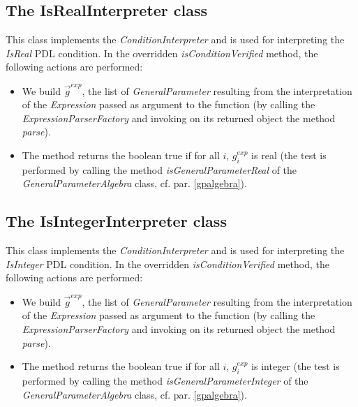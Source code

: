\documentclass[a4paper,11pt] {ivoa}
\begin{document}
\subsection{The IsRealInterpreter class}
This class  implements the  {\it ConditionInterpreter} and is used for interpreting the {\it IsReal} PDL condition. In the overridden {\it isConditionVerified} method, the following actions are performed:
\begin{itemize}
\item We build $\vec g^{exp}$, the list of {\it GeneralParameter} resulting from the interpretation of the {\it Expression} passed as argument to the function (by calling the {\it ExpressionParserFactory} and invoking on its returned object the method {\it parse}). 
\item The method returns the boolean true if for all $i$, $g_i^{exp}$ is real (the test is performed by calling the method {\it isGeneralParameterReal} of the {\it GeneralParameterAlgebra} class, cf. par. \ref{gpalgebra}).
\end{itemize}

\subsection{The IsIntegerInterpreter class}
This class  implements the  {\it ConditionInterpreter} and is used for interpreting the {\it IsInteger} PDL condition. In the overridden {\it isConditionVerified} method, the following actions are performed:
\begin{itemize}
\item We build $\vec g^{exp}$, the list of {\it GeneralParameter} resulting from the interpretation of the {\it Expression} passed as argument to the function (by calling the {\it ExpressionParserFactory} and invoking on its returned object the method {\it parse}). 
\item The method returns the boolean true if for all $i$, $g_i^{exp}$ is integer (the test is performed by calling the method {\it isGeneralParameterInteger} of the {\it GeneralParameterAlgebra} class, cf. par. \ref{gpalgebra}).
\end{itemize}
\end{document}
